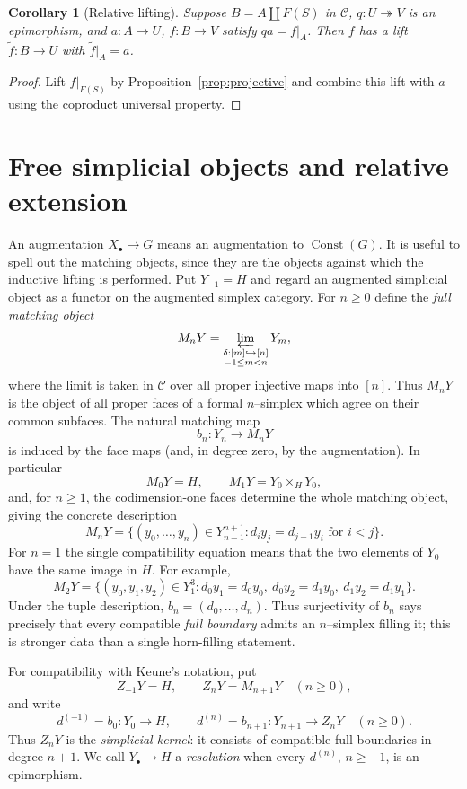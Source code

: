 \documentclass[11pt,a4paper]{article}
\newtheorem{corollary}[theorem]{Corollary}
\theoremstyle{definition}
\newcommand{\C}{\mathcal C}
\newcommand{\Const}{\operatorname{Const}}
\begin{document}
\begin{corollary}[Relative lifting]\label{cor:relative}
Suppose $B=A\amalg F(S)$ in $\C$, $q:U\twoheadrightarrow V$ is an
epimorphism, and $a:A\to U$, $f:B\to V$ satisfy $qa=f|_A$.
Then $f$ has a lift $\widetilde f:B\to U$ with $\widetilde f|_A=a$.
\end{corollary}
\begin{proof}
Lift $f|_{F(S)}$ by Proposition~\ref{prop:projective} and combine this
lift with $a$ using the coproduct universal property.
\end{proof}

\section{Free simplicial objects and relative extension}

An augmentation $X_\bullet\to G$ means an augmentation to
$\Const(G)$. It is useful to spell out the matching objects, since they
are the objects against which the inductive lifting is performed. Put
$Y_{-1}=H$ and regard an augmented simplicial object as a functor on the
augmented simplex category. For $n\geq0$ define the \emph{full matching
object}
\[
 M_nY=\varprojlim_{\substack{\delta:[m]\hookrightarrow[n]\\-1\leq m<n}}Y_m,
\]
where the limit is taken in $\C$ over all proper injective maps into
$[n]$. Thus $M_nY$ is the object of all proper faces of a formal
$n$--simplex which agree on their common subfaces. The natural matching
map
\[
 b_n:Y_n\longrightarrow M_nY
\]
is induced by the face maps (and, in degree zero, by the augmentation).
In particular
\[
 M_0Y=H,\qquad M_1Y=Y_0\times_HY_0,
\]
and, for $n\geq1$, the codimension-one faces determine the whole
matching object, giving the concrete description
\[
 M_nY=\{(y_0,\ldots,y_n)\in Y_{n-1}^{n+1}:
              d_i y_j=d_{j-1}y_i\text{ for }i<j\}.
\]
For $n=1$ the single compatibility equation means that the two elements
of $Y_0$ have the same image in $H$. For example,
\[
 M_2Y=\{(y_0,y_1,y_2)\in Y_1^3:
 d_0y_1=d_0y_0,\ d_0y_2=d_1y_0,\ d_1y_2=d_1y_1\}.
\]
Under the tuple description, $b_n=(d_0,\ldots,d_n)$. Thus surjectivity
of $b_n$ says precisely that every compatible \emph{full boundary}
admits an $n$--simplex filling it; this is stronger data than a single
horn-filling statement.

For compatibility with Keune's notation, put
\[
 Z_{-1}Y=H,\qquad Z_nY=M_{n+1}Y\quad(n\geq0),
\]
and write
\[
 d^{(-1)}=b_0:Y_0\longrightarrow H,\qquad
 d^{(n)}=b_{n+1}:Y_{n+1}\longrightarrow Z_nY\quad(n\geq0).
\]
Thus $Z_nY$ is the \emph{simplicial kernel}: it consists of compatible
full boundaries in degree $n+1$. We call $Y_\bullet\to H$ a
\emph{resolution} when every $d^{(n)}$, $n\geq-1$, is an epimorphism.
\end{document}
